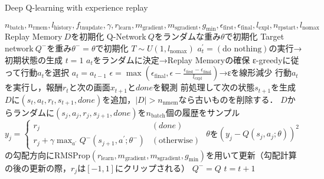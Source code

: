 \documentclass{jarticle}
\begin{document}
\begin{algorithm}[tb]
\caption{Deep Q-learning with experience replay}
\label{alg:dqn}                          
\begin{algorithmic}[1]   
\REQUIRE $n_{\mathrm{batch}},n_{\mathrm{rmem}},l_{\mathrm{history}},f_{\mathrm{tnupdate}},\gamma,r_{\mathrm{learn}},m_{\mathrm{gradient}},m_{\mathrm{sgradient}},g_{\mathrm{min}},\epsilon_{\mathrm{first}},\epsilon_{\mathrm{final}},l_{\mathrm{expl}},n_{\mathrm{rpstart}},l_{\mathrm{nomax}}$
\STATE Replay Memory$~D$を初期化
\STATE Q-Network$~Q$をランダムな重み$\theta$で初期化
\STATE Target network$~Q^-$を重み$\theta^-=\theta$で初期化
\STATE $T\sim U(1,l_{\mathrm{nomax}})$
\STATE $a_t^{\prime}=(\mbox{do nothing})$の実行→初期状態の生成
\ENDFOR
\STATE $t=1$
\STATE $a_t$をランダムに決定→Replay Memoryの確保
\ELSE
{}
\STATE ε-greedyに従って行動$a_t$を選択
\ELSE
\STATE $a_t=a_{t-1}$
\ENDIF
\STATE $\epsilon=\max{(\epsilon_{\mathrm{final}},\epsilon-\frac{\epsilon_{\mathrm{first}}-\epsilon_{\mathrm{final}}}{l_{\mathrm{expl}}})}$→εを線形減少
\ENDIF
\STATE 行動$a_t$を実行し，報酬$r_t$と次の画面$x_{t+1}$と$done$を観測
\STATE 前処理して次の状態$s_{t+1}$を生成
\STATE $D$に$(s_t,a_t,r_t,s_{t+1},done)$を追加，$|D|>n_{\mathrm{nmem}}$なら古いものを削除する．
\STATE $D$からランダムに$(s_j,a_j,r_j,s_{j+1},done)$を$n_{\mathrm{batch}}$個の履歴をサンプル
\STATE $y_j=
\begin{cases}
r_j & (done) \\
r_j+\gamma\max_{a^{\prime}}Q^-(s_{j+1},a^{\prime};\theta^-) & (\mbox{otherwise})
\end{cases}$
\STATE $\theta$を$(y_j-Q(s_j,a_j;\theta))^2$の勾配方向にRMSProp$(r_{\mathrm{learn}},m_{\mathrm{gradient}},m_{\mathrm{sgradient}},g_{\mathrm{min}})$を用いて更新（勾配計算の後の更新の際，$r_j$は$[-1,1]$にクリップされる）
\ENDIF
{}
\STATE $Q^-=Q$
\ENDIF
\ENDIF
\STATE $t=t+1$
\ENDWHILE
\ENDFOR
\end{algorithmic}
\end{algorithm}
\end{document}
